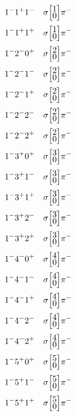 \documentclass[10pt,a4paper]{article}
\def\dst{\displaystyle}
\def\vsp{\hbox{\vrule height12.5pt depth3.5pt width0pt}}
\def\ells#1#2{\Big[\hskip-5pt\vsp\begin{array}{c}\dst#1\\[-4pt]\dst#2\end{array}\vsp\hskip-5pt\Big]}
\begin{document}
\begin{align*} 
 \begin{aligned}
1^{-}1^{+}1^{-}\quad & \sigma\ells{1}{0}\pi^-\\
1^{-}1^{+}1^{+}\quad & \sigma\ells{1}{0}\pi^-\\
1^{-}2^{-}0^{+}\quad & \sigma\ells{2}{0}\pi^-\\
1^{-}2^{-}1^{-}\quad & \sigma\ells{2}{0}\pi^-\\
1^{-}2^{-}1^{+}\quad & \sigma\ells{2}{0}\pi^-\\
1^{-}2^{-}2^{-}\quad & \sigma\ells{2}{0}\pi^-\\
1^{-}2^{-}2^{+}\quad & \sigma\ells{2}{0}\pi^-\\
1^{-}3^{+}0^{+}\quad & \sigma\ells{3}{0}\pi^-\\
1^{-}3^{+}1^{-}\quad & \sigma\ells{3}{0}\pi^-\\
1^{-}3^{+}1^{+}\quad & \sigma\ells{3}{0}\pi^-\\
1^{-}3^{+}2^{-}\quad & \sigma\ells{3}{0}\pi^-\\
1^{-}3^{+}2^{+}\quad & \sigma\ells{3}{0}\pi^-\\
1^{-}4^{-}0^{+}\quad & \sigma\ells{4}{0}\pi^-\\
1^{-}4^{-}1^{-}\quad & \sigma\ells{4}{0}\pi^-\\
1^{-}4^{-}1^{+}\quad & \sigma\ells{4}{0}\pi^-\\
1^{-}4^{-}2^{-}\quad & \sigma\ells{4}{0}\pi^-\\
1^{-}4^{-}2^{+}\quad & \sigma\ells{4}{0}\pi^-\\
1^{-}5^{+}0^{+}\quad & \sigma\ells{5}{0}\pi^-\\
1^{-}5^{+}1^{-}\quad & \sigma\ells{5}{0}\pi^-\\
1^{-}5^{+}1^{+}\quad & \sigma\ells{5}{0}\pi^-\\
\end{aligned} 
 \end{align*}\pagebreak
\end{document}
